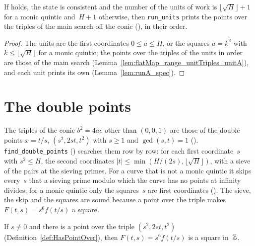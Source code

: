 \begin{lemma}\label{lem:runUnits_spec}
  \leanok
  If  holds, the state is consistent and the number of the units of
  work is $\lfloor \sqrt{H} \rfloor + 1$ for a monic quintic and~$H + 1$ otherwise, then
  \texttt{run\_units} prints the points over the triples of the main search off the conic
  (), in their order.
\end{lemma}

\begin{proof}
  \leanok
  The units are the first coordinates $0 \le a \le H$, or the squares $a = k^2$ with
  $k \le \lfloor \sqrt{H} \rfloor$ for a monic quintic; the points over the triples of the units
  in order are those of the main search (Lemma~\ref{lem:flatMap_range_unitTriples_unitA}), and each
  unit prints its own (Lemma~\ref{lem:runA_spec}).
\end{proof}

\section{The double points}\label{sec:doublePoints}

The triples of the conic $b^2 = 4 a c$ other than $(0, 0, 1)$ are those of the double points
$x = t/s$, $(s^2, 2 s t, t^2)$ with $s \ge 1$ and $\gcd(s, t) = 1$ ().
\texttt{find\_double\_points} () searches them row by row: for each
first coordinate~$s$ with $s^2 \le H$, the second coordinates
$|t| \le \min(H/(2 s), \lfloor \sqrt{H} \rfloor)$, with a sieve of the pairs at the sieving primes.
For a curve that is not a monic quintic it skips every~$s$ that a sieving prime modulo which the
curve has no points at infinity divides; for a monic quintic only the squares~$s$ are first
coordinates (). The sieve, the skip and the
squares are sound because a point over the triple makes $F(t, s) = s^6 f(t/s)$ a square.

\begin{lemma}\label{lem:isSquare_sexticForm_of_hasPointOver}
  \leanok
  If $s \ne 0$ and there is a point over the triple $(s^2, 2 s t, t^2)$
  (Definition~\ref{def:HasPointOver}), then $F(t, s) = s^6 f(t/s)$ is a square in~$\mathbb{Z}$.
\end{lemma}

